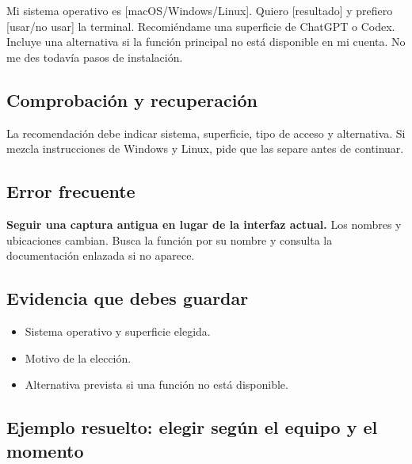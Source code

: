\documentclass[10pt,a4paper,openany]{book}
\providecommand{\tightlist}{\setlength{\itemsep}{0.18em}\setlength{\parskip}{0pt}}
\newenvironment{Shaded}{}{}
\newcommand{\NormalTok}[1]{#1}
\renewenvironment{Shaded}
  {\begin{tcolorbox}[
    enhanced,
    breakable,
    colback=CodeBg,
    colframe=Border,
    boxrule=0.5pt,
    arc=2mm,
    left=3mm,
    right=3mm,
    top=2.2mm,
    bottom=2.2mm,
    before skip=0.8em,
    after skip=0.9em
  ]}
  {\end{tcolorbox}}
\begin{document}
\begin{Shaded}
\begin{Highlighting}[]
\NormalTok{Mi sistema operativo es [macOS/Windows/Linux]. Quiero [resultado] y prefiero}
\NormalTok{[usar/no usar] la terminal. Recomiéndame una superficie de ChatGPT o Codex.}
\NormalTok{Incluye una alternativa si la función principal no está disponible en mi cuenta.}
\NormalTok{No me des todavía pasos de instalación.}
\end{Highlighting}
\end{Shaded}

\subsection{Comprobación y
recuperación}\label{comprobaciuxf3n-y-recuperaciuxf3n-1}

La recomendación debe indicar sistema, superficie, tipo de acceso y
alternativa. Si mezcla instrucciones de Windows y Linux, pide que las
separe antes de continuar.

\subsection{Error frecuente}\label{error-frecuente-1}

\textbf{Seguir una captura antigua en lugar de la interfaz actual.} Los
nombres y ubicaciones cambian. Busca la función por su nombre y consulta
la documentación enlazada si no aparece.

\subsection{Evidencia que debes
guardar}\label{evidencia-que-debes-guardar-1}

\begin{itemize}
\tightlist
\item
  Sistema operativo y superficie elegida.
\item
  Motivo de la elección.
\item
  Alternativa prevista si una función no está disponible.
\end{itemize}

\subsection{Ejemplo resuelto: elegir según el equipo y el
momento}\label{ejemplo-resuelto-elegir-seguxfan-el-equipo-y-el-momento}
\end{document}
